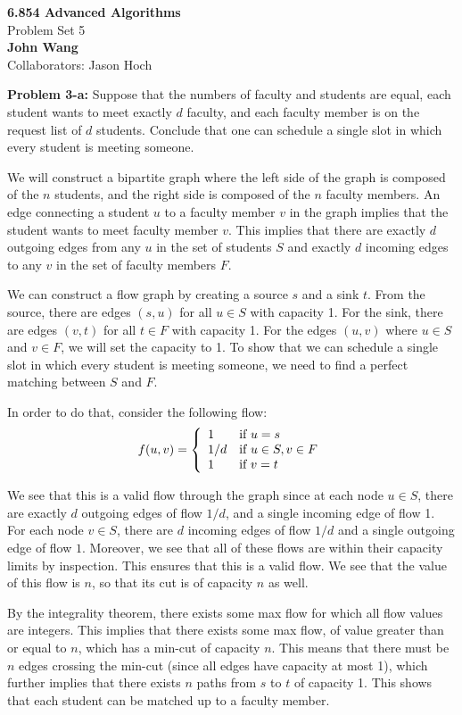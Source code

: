 \documentclass[psamsfonts]{amsart}
\newenvironment{sol}{\vspace{0.25cm}{\large \bfseries Solution:}}{\qedsymbol}
\newenvironment{prob}[1]{\begin{framed}{\large \bfseries Problem #1:}}{\end{framed}}
\newcommand{\makenewtitle}{
    \begin{center}
    {\huge \bfseries 6.854 Advanced Algorithms} \\
    Problem Set 5\\
    \vspace{0.25cm}
    {\bfseries John Wang} \\
    Collaborators: Jason Hoch
    \end{center}
    \vspace{0.5cm}
}
\begin{document}
\newpage
\makenewtitle

\begin{prob}{3-a}
Suppose that the numbers of faculty and students are equal, each student wants to meet exactly $d$ faculty, and each faculty member is on the request list of $d$ students. Conclude that one can schedule a single slot in which every student is meeting someone. 
\end{prob}
\begin{sol}
We will construct a bipartite graph where the left side of the graph is composed of the $n$ students, and the right side is composed of the $n$ faculty members. An edge connecting a student $u$ to a faculty member $v$ in the graph implies that the student wants to meet faculty member $v$. This implies that there are exactly $d$ outgoing edges from any $u$ in the set of students $S$ and exactly $d$ incoming edges to any $v$ in the set of faculty members $F$. 

We can construct a flow graph by creating a source $s$ and a sink $t$. From the source, there are edges $(s,u)$ for all $u \in S$ with capacity 1. For the sink, there are edges $(v, t)$ for all $t \in F$ with capacity 1. For the edges $(u,v)$ where $u \in S$ and $v \in F$, we will set the capacity to 1. To show that we can schedule a single slot in which every student is meeting someone, we need to find a perfect matching between $S$ and $F$.

In order to do that, consider the following flow: 
\begin{eqnarray}
f(u,v) = \left\{\begin{array}{l l}
1 & \text{if } u = s \\
1/d & \text{if } u \in S, v \in F \\
1 & \text{if } v = t
\end{array}\right.
\end{eqnarray}

We see that this is a valid flow through the graph since at each node $u \in S$, there are exactly $d$ outgoing edges of flow $1/d$, and a single incoming edge of flow 1. For each node $v \in S$, there are $d$ incoming edges of flow $1/d$ and a single outgoing edge of flow $1$. Moreover, we see that all of these flows are within their capacity limits by inspection. This ensures that this is a valid flow. We see that the value of this flow is $n$, so that its cut is of capacity $n$ as well.

By the integrality theorem, there exists some max flow for which all flow values are integers. This implies that there exists some max flow, of value greater than or equal to $n$, which has a min-cut of capacity $n$. This means that there must be $n$ edges crossing the min-cut (since all edges have capacity at most 1), which further implies that there exists $n$ paths from $s$ to $t$ of capacity 1. This shows that each student can be matched up to a faculty member.
\end{sol}
\end{document}
